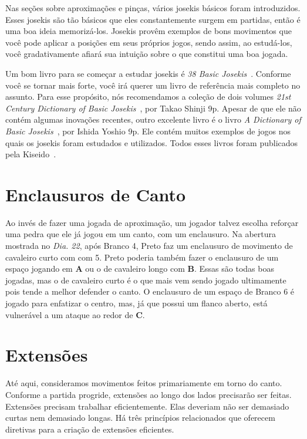 Nas seções sobre aproximações e pinças, vários josekis básicos foram introduzidos. Esses josekis são tão básicos que eles constantemente surgem em partidas, então é uma boa ideia memorizá-los. Josekis provêm exemplos de bons movimentos que você pode aplicar a posições em seus próprios jogos, sendo assim, ao estudá-los, você gradativamente afiará sua intuição sobre o que constitui uma boa jogada.

Um bom livro para se começar a estudar josekis é \emph{38 Basic Josekis}~\cite{kosugi_bozulich_38_basic_joseki}. Conforme você se tornar mais forte, você irá querer um livro de referência mais completo no assunto. Para esse propósito, nós recomendamos a coleção de dois volumes \emph{21st Century Dictionary of Basic Josekis}~\cite{takao_shinji_21st_century_joseki_dictionary}, por Takao Shinji 9p. Apesar de que ele não contém algumas inovações recentes, outro excelente livro é o livro \emph{A Dictionary of Basic Josekis}~\cite{ishida_yoshio_basic_joseki_dictionary}, por Ishida Yoshio 9p. Ele contém muitos exemplos de jogos nos quais os josekis foram estudados e utilizados. Todos esses livros foram publicados pela Kiseido~\cite{kiseido}.

\section{Enclausuros de Canto}

Ao invés de fazer uma jogada de aproximação, um jogador talvez escolha reforçar uma pedra que ele já jogou em um canto, com um enclausuro. Na abertura mostrada no \emph{Dia. 22}, após Branco 4, Preto faz um enclausuro de movimento de cavaleiro curto com com 5. Preto poderia também fazer o enclausuro de um espaço jogando em \textbf{A} ou o de cavaleiro longo com \textbf{B}. Essas são todas boas jogadas, mas o de cavaleiro curto é o que mais vem sendo jogado ultimamente pois tende a melhor defender o canto. O enclausuro de um espaço de Branco 6 é jogado para enfatizar o centro, mas, já que possui um flanco aberto, está vulnerável a um ataque ao redor de \textbf{C}.

\section{Extensões}

Até aqui, consideramos movimentos feitos primariamente em torno do canto. Conforme a partida progride, extensões ao longo dos lados precisarão ser feitas. Extensões precisam trabalhar eficientemente. Elas deveriam não ser demasiado curtas nem demasiado longas. Há três princípios relacionados que oferecem diretivas para a criação de extensões eficientes.

